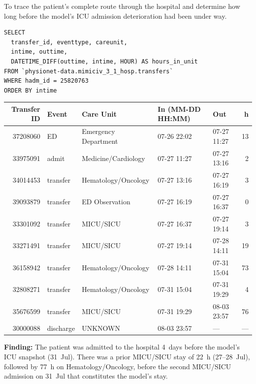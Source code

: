 \documentclass[12pt, a4paper]{article}
\begin{document}
To trace the patient's complete route through the hospital and determine how
long before the model's ICU admission deterioration had been under way.

\begin{lstlisting}[style=sql]
SELECT
  transfer_id, eventtype, careunit,
  intime, outtime,
  DATETIME_DIFF(outtime, intime, HOUR) AS hours_in_unit
FROM `physionet-data.mimiciv_3_1_hosp.transfers`
WHERE hadm_id = 25820763
ORDER BY intime
\end{lstlisting}

\medskip
{\scriptsize\setlength{\tabcolsep}{4pt}
\begin{tabular}{r l p{4.2cm} l l r}
\toprule
\textbf{Transfer ID} & \textbf{Event} & \textbf{Care Unit} & \textbf{In (MM-DD HH:MM)} & \textbf{Out} & \textbf{h} \\
\midrule
37208060 & ED       & Emergency Department   & 07-26 22:02 & 07-27 11:27 & 13 \\
33975091 & admit    & Medicine/Cardiology    & 07-27 11:27 & 07-27 13:16 & 2  \\
34014453 & transfer & Hematology/Oncology    & 07-27 13:16 & 07-27 16:19 & 3  \\
39093879 & transfer & ED Observation         & 07-27 16:19 & 07-27 16:37 & 0  \\
33301092 & transfer & MICU/SICU              & 07-27 16:37 & 07-27 19:14 & 3  \\
33271491 & transfer & MICU/SICU              & 07-27 19:14 & 07-28 14:11 & 19 \\
36158942 & transfer & Hematology/Oncology    & 07-28 14:11 & 07-31 15:04 & 73 \\
32808271 & transfer & Hematology/Oncology    & 07-31 15:04 & 07-31 19:29 & 4  \\
35676599 & transfer & MICU/SICU              & 07-31 19:29 & 08-03 23:57 & 76 \\
30000088 & discharge & UNKNOWN               & 08-03 23:57 & ---         & ---\\
\bottomrule
\end{tabular}
}

\noindent\textbf{Finding:} The patient was admitted to the hospital 4~days before the
model's ICU snapshot (31~Jul). There was a prior MICU/SICU stay of 22~h
(27--28~Jul), followed by 77~h on Hematology/Oncology, before the
second MICU/SICU admission on 31~Jul that constitutes the model's stay.

\end{document}
